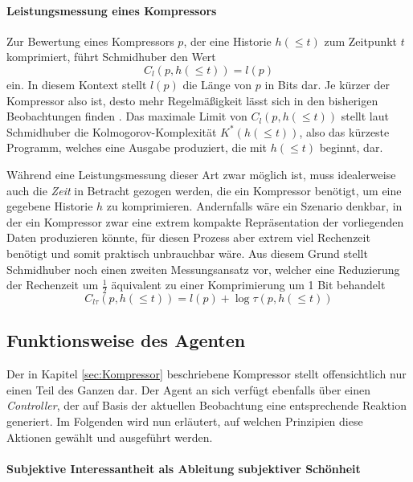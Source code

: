 \paragraph{Leistungsmessung eines Kompressors}
\label{sec:Leistungs_messung}
Zur Bewertung eines Kompressors \(p\), der eine Historie \(h(\leq t)\) zum Zeitpunkt \(t\) komprimiert, führt Schmidhuber den Wert 
\begin{equation}
  C_l(p,h(\leq t)) = l(p)  
\end{equation}
ein. In diesem Kontext stellt \(l(p)\) die Länge von \(p\) in Bits dar. Je kürzer der Kompressor also ist, desto mehr Regelmäßigkeit lässt sich in den bisherigen Beobachtungen finden \cite[p.~19]{curiosity_schmidhuber}.
Das maximale Limit von \(C_l(p,h(\leq t))\) stellt laut Schmidhuber die Kolmogorov-Komplexität \(K^*(h(\leq t))\), also das kürzeste Programm, welches eine Ausgabe produziert, die mit \(h(\leq t)\) beginnt, dar.

Während eine Leistungsmessung dieser Art zwar möglich ist, muss idealerweise auch die \emph{Zeit} in Betracht gezogen werden, die ein Kompressor benötigt, um eine gegebene Historie \(h\) zu komprimieren. Andernfalls wäre ein Szenario denkbar, in der ein Kompressor zwar eine extrem kompakte Repräsentation der vorliegenden Daten produzieren könnte, für diesen Prozess aber extrem viel Rechenzeit benötigt und somit praktisch unbrauchbar wäre.
Aus diesem Grund stellt Schmidhuber noch einen zweiten Messungsansatz vor, welcher eine Reduzierung der Rechenzeit um \(\frac{1}{2}\) äquivalent zu einer Komprimierung um 1 Bit behandelt \cite[p.~19]{curiosity_schmidhuber}
\begin{equation}
  C_{l\tau}(p,h(\leq t)) = l(p) + \log \tau(p, h(\leq t)) 
\end{equation}


\subsection{Funktionsweise des Agenten}
Der in Kapitel \ref{sec:Kompressor} beschriebene Kompressor stellt offensichtlich nur einen Teil des Ganzen dar. Der Agent an sich verfügt ebenfalls über einen \emph{Controller}, der auf Basis der aktuellen Beobachtung eine entsprechende Reaktion generiert.
Im Folgenden wird nun erläutert, auf welchen Prinzipien diese Aktionen gewählt und ausgeführt werden.

\paragraph{Subjektive Interessantheit als Ableitung subjektiver Schönheit}
\label{sec:Beauty_und_Curiosity}


